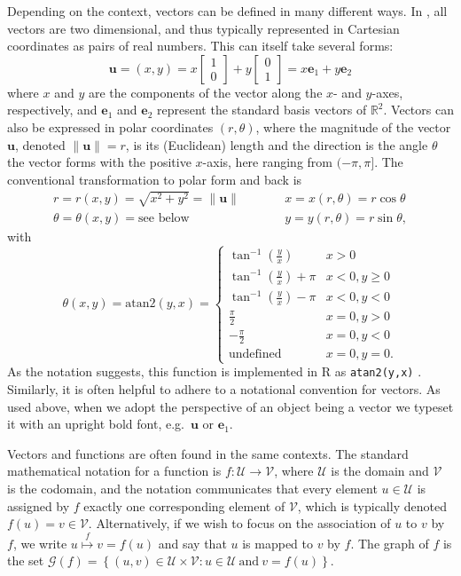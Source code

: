 Depending on the context, vectors can be defined in many different ways. In , all vectors are two dimensional, and thus typically represented in Cartesian coordinates as pairs of real numbers. This can itself take several forms:
\[\mathbf{u} = (x, y) = x\begin{bmatrix}1\\0\end{bmatrix} + y\begin{bmatrix}0\\1\end{bmatrix} = x\mathbf{e}_{1} + y\mathbf{e}_{2}\]
where \(x\) and \(y\) are the components of the vector along the \(x\)- and \(y\)-axes, respectively, and \(\mathbf{e}_{1}\) and \(\mathbf{e}_{2}\) represent the standard basis vectors of \(\mathbb{R}^{2}\). Vectors can also be expressed in polar coordinates \((r,\theta)\), where the magnitude of the vector \(\mathbf{u}\), denoted \(\|\mathbf{u}\| = r\), is its (Euclidean) length and the direction is the angle \(\theta\) the vector forms with the positive \(x\)-axis, here ranging from \((-\pi,\pi]\). The conventional transformation to polar form and back is
\[
\begin{array}{lcl}
r  =  r(x, y)  =  \sqrt{x^{2} + y^{2}}  =  \|\mathbf{u}\|   &\qquad& x  =  x(r, \theta)  =  r \cos \theta\\
\theta =  \theta(x, y)  =  \mbox{see below}                  &\qquad& y  =  y(r, \theta)  =  r \sin \theta,
\end{array}
\]
with
\[\theta(x, y) = \mbox{atan2}(y,x) = \begin{cases}
\tan^{-1}(\frac{y}{x}) & x > 0 \\
\tan^{-1}(\frac{y}{x}) + \pi & x < 0, y \geq 0 \\
\tan^{-1}(\frac{y}{x}) - \pi & x < 0, y < 0 \\
\frac{\pi}{2} & x = 0, y > 0 \\
-\frac{\pi}{2} & x = 0, y < 0 \\
\mbox{undefined} & x = 0, y = 0.
\end{cases}\]
As the notation suggests, this function is implemented in R as \texttt{atan2(y,x)} \citep{R}. Similarly, it is often helpful to adhere to a notational convention for vectors. As used above, when we adopt the perspective of an object being a vector we typeset it with an upright bold font, e.g.~\(\mathbf{u}\) or \(\mathbf{e}_{1}\).

Vectors and functions are often found in the same contexts. The standard mathematical notation for a function is \(f: \mathcal{U} \to \mathcal{V}\), where \(\mathcal{U}\) is the domain and \(\mathcal{V}\) is the codomain, and the notation communicates that every element \(u \in \mathcal{U}\) is assigned by \(f\) exactly one corresponding element of \(\mathcal{V}\), which is typically denoted \(f(u) = v \in \mathcal{V}\). Alternatively, if we wish to focus on the association of \(u\) to \(v\) by \(f\), we write \(u \stackrel{f}{\longmapsto} v = f(u)\) and say that \(u\) is mapped to \(v\) by \(f\). The graph of \(f\) is the set \(\mathcal{G}(f) = \left\{(u,v) \in \mathcal{U}\times\mathcal{V}: u \in \mathcal{U}~\mbox{and}~v = f(u)\right\}\).

